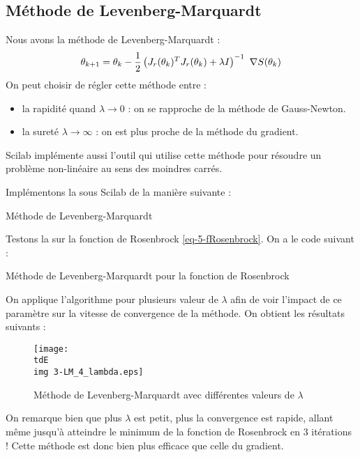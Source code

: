 	\subsection{Méthode de Levenberg-Marquardt}

		Nous avons la méthode de Levenberg-Marquardt :
		\begin{equation}
			\label{eq-5-levenbergMarquardt}
			\theta_{k+1} = \theta_k - \frac{1}{2}\left( J_r(\theta_k)^T J_r(\theta_k) + \lambda I \right)^{-1} ~\nabla S(\theta_k)			
		\end{equation}
		On peut choisir de régler cette méthode entre :
		\begin{itemize}
			\item la rapidité quand $\lambda \to 0$ : on se rapproche de la méthode de Gauss-Newton.
			\item la sureté $\lambda \to \infty$ : on est plus proche de la méthode du gradient.
		\end{itemize}

		Scilab implémente aussi l'outil  qui utilise cette méthode pour résoudre un problème non-linéaire au sens des moindres carrés. 

		Implémentons la sous Scilab de la manière suivante :

		\begin{listing}[H]
			\caption{Méthode de Levenberg-Marquardt}
			\label{code-5-methLM}
		\end{listing}

		Testons la sur la fonction de Rosenbrock \eqref{eq-5-fRosenbrock}.
		On a le code suivant :

		\begin{listing}[H]
			\caption{Méthode de Levenberg-Marquardt pour la fonction de Rosenbrock}
			\label{code-5-methLMRosen}
		\end{listing}

		On applique l'algorithme pour plusieurs valeur de $\lambda$ afin de voir l'impact de ce paramètre sur la vitesse de convergence de la méthode.
		On obtient les résultats suivants :

		\begin{figure}[H]
			\centering
			\texttt{[image: \\tdE\\img 3-LM\_4\_lambda.eps]}
			\caption{Méthode de Levenberg-Marquardt avec différentes valeurs de $\lambda$}
			\label{img-5-LMRosen4lambda}
		\end{figure}

		On remarque bien que plus $\lambda$ est petit, plus la convergence est rapide, allant même jusqu'à atteindre le minimum de la fonction de Rosenbrock en $3$ itérations ! Cette méthode est donc bien plus efficace que celle du gradient.	

